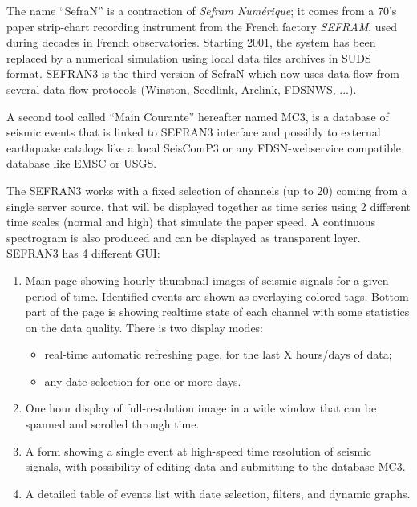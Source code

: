 The name ``SefraN'' is a contraction of \textit{Sefram Numérique}; it comes from a 70's paper strip-chart recording instrument from the French factory \textit{SEFRAM\textregistered}, used during decades in French observatories. Starting 2001, the system has been replaced by a numerical simulation using local data files archives in SUDS format. SEFRAN3 is the third version of SefraN which now uses data flow from several data flow protocols (Winston, Seedlink, Arclink, FDSNWS, ...).

A second tool called ``Main Courante'' hereafter named MC3, is a database of seismic events that is linked to SEFRAN3 interface and possibly to external earthquake catalogs like a local SeisComP3 or any FDSN-webservice compatible database like EMSC or USGS.

The SEFRAN3 works with a fixed selection of channels (up to 20) coming from a single server source, that will be displayed together as time series using 2 different time scales (normal and high) that simulate the paper speed. A continuous spectrogram is also produced and can be displayed as transparent layer. SEFRAN3 has 4 different GUI:
\begin{enumerate}

\item Main page showing hourly thumbnail images of seismic signals for a given period of time. Identified events are shown as overlaying colored tags. Bottom part of the page is showing realtime state of each channel with some statistics on the data quality. There is two display modes:
\begin{itemize}
\item real-time automatic refreshing page, for the last X hours/days of data;
\item any date selection for one or more days.
\end{itemize}

\item One hour display of full-resolution image in a wide window that can be spanned and scrolled through time.

\item A form showing a single event at high-speed time resolution of seismic signals, with possibility of editing data and submitting to the database MC3.

\item A detailed table of events list with date selection, filters, and dynamic graphs.

\end{enumerate}

